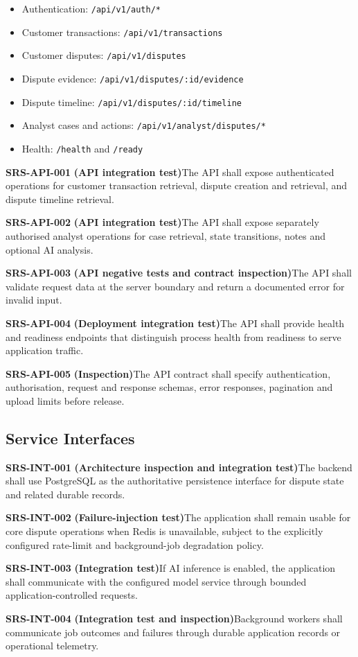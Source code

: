 \documentclass[11pt,a4paper]{article}
\newcommand{\req}[3]{%
    \par\noindent\textbf{\color{ADGBlue}#1}\quad
    \textbf{(#3)}\enspace #2\par\smallskip
}
\begin{document}
\begin{itemize}
    \item Authentication: \texttt{/api/v1/auth/*}
    \item Customer transactions: \texttt{/api/v1/transactions}
    \item Customer disputes: \texttt{/api/v1/disputes}
    \item Dispute evidence:
    \texttt{/api/v1/disputes/:id/evidence}
    \item Dispute timeline:
    \texttt{/api/v1/disputes/:id/timeline}
    \item Analyst cases and actions:
    \texttt{/api/v1/analyst/disputes/*}
    \item Health: \texttt{/health} and \texttt{/ready}
\end{itemize}

\req{SRS-API-001}{The API shall expose authenticated operations for customer transaction retrieval, dispute creation and retrieval, and dispute timeline retrieval.}{API integration test}
\req{SRS-API-002}{The API shall expose separately authorised analyst operations for case retrieval, state transitions, notes and optional AI analysis.}{API integration test}
\req{SRS-API-003}{The API shall validate request data at the server boundary and return a documented error for invalid input.}{API negative tests and contract inspection}
\req{SRS-API-004}{The API shall provide health and readiness endpoints that distinguish process health from readiness to serve application traffic.}{Deployment integration test}
\req{SRS-API-005}{The API contract shall specify authentication, authorisation, request and response schemas, error responses, pagination and upload limits before release.}{Inspection}

\subsection{Service Interfaces}

\req{SRS-INT-001}{The backend shall use PostgreSQL as the authoritative persistence interface for dispute state and related durable records.}{Architecture inspection and integration test}
\req{SRS-INT-002}{The application shall remain usable for core dispute operations when Redis is unavailable, subject to the explicitly configured rate-limit and background-job degradation policy.}{Failure-injection test}
\req{SRS-INT-003}{If AI inference is enabled, the application shall communicate with the configured model service through bounded application-controlled requests.}{Integration test}
\req{SRS-INT-004}{Background workers shall communicate job outcomes and failures through durable application records or operational telemetry.}{Integration test and inspection}
\end{document}
